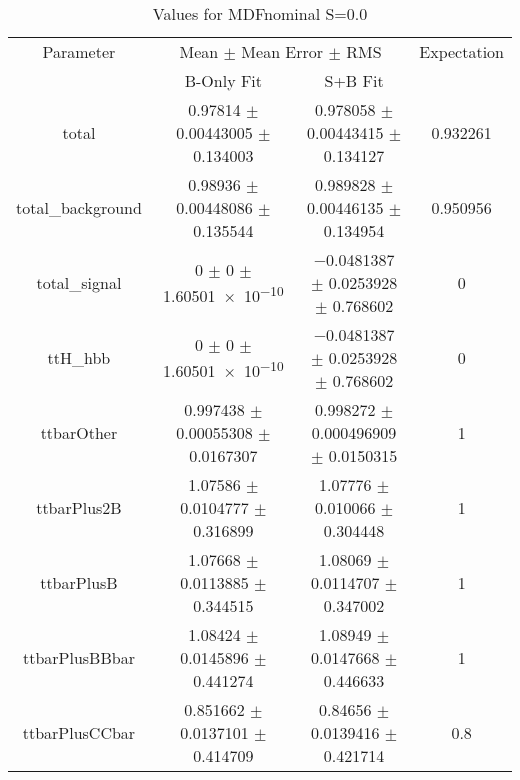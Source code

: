 \begin{table}
\centering
\caption{Values for MDFnominal S=0.0}
\begin{tabular}{cccc}
\toprule
Parameter & \multicolumn{2}{c}{Mean $\pm$ Mean Error $\pm$ RMS} & Expectation\\
 & B-Only Fit & S+B Fit & \\
\midrule
total & \num{0.97814} $\pm$ \num{0.00443005} $\pm$ \num{0.134003} & \num{0.978058} $\pm$ \num{0.00443415} $\pm$ \num{0.134127} & \num{0.932261}\\
total\_background & \num{0.98936} $\pm$ \num{0.00448086} $\pm$ \num{0.135544} & \num{0.989828} $\pm$ \num{0.00446135} $\pm$ \num{0.134954} & \num{0.950956}\\
total\_signal & \num{0} $\pm$ \num{0} $\pm$ \num{1.60501e-10} & \num{-0.0481387} $\pm$ \num{0.0253928} $\pm$ \num{0.768602} & \num{0}\\
ttH\_hbb & \num{0} $\pm$ \num{0} $\pm$ \num{1.60501e-10} & \num{-0.0481387} $\pm$ \num{0.0253928} $\pm$ \num{0.768602} & \num{0}\\
ttbarOther & \num{0.997438} $\pm$ \num{0.00055308} $\pm$ \num{0.0167307} & \num{0.998272} $\pm$ \num{0.000496909} $\pm$ \num{0.0150315} & \num{1}\\
ttbarPlus2B & \num{1.07586} $\pm$ \num{0.0104777} $\pm$ \num{0.316899} & \num{1.07776} $\pm$ \num{0.010066} $\pm$ \num{0.304448} & \num{1}\\
ttbarPlusB & \num{1.07668} $\pm$ \num{0.0113885} $\pm$ \num{0.344515} & \num{1.08069} $\pm$ \num{0.0114707} $\pm$ \num{0.347002} & \num{1}\\
ttbarPlusBBbar & \num{1.08424} $\pm$ \num{0.0145896} $\pm$ \num{0.441274} & \num{1.08949} $\pm$ \num{0.0147668} $\pm$ \num{0.446633} & \num{1}\\
ttbarPlusCCbar & \num{0.851662} $\pm$ \num{0.0137101} $\pm$ \num{0.414709} & \num{0.84656} $\pm$ \num{0.0139416} $\pm$ \num{0.421714} & \num{0.8}\\
\bottomrule
\end{tabular}
\end{table}